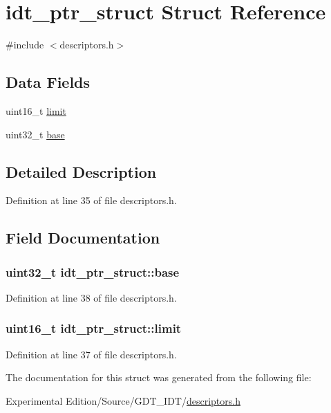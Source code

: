 \hypertarget{structidt__ptr__struct}{}\section{idt\+\_\+ptr\+\_\+struct Struct Reference}
\label{structidt__ptr__struct}


{\ttfamily \#include $<$descriptors.\+h$>$}

\subsection*{Data Fields}
\begin{DoxyCompactItemize}
\item 
uint16\+\_\+t \hyperlink{structidt__ptr__struct_a0401a63eb17ed7519442b1e828510acc}{limit}
\item 
uint32\+\_\+t \hyperlink{structidt__ptr__struct_a1d3ba4d284df0cea7c7b2d1a22a7d9fb}{base}
\end{DoxyCompactItemize}


\subsection{Detailed Description}


Definition at line 35 of file descriptors.\+h.



\subsection{Field Documentation}
\subsubsection[{\texorpdfstring{base}{base}}]{\setlength{\rightskip}{0pt plus 5cm}uint32\+\_\+t idt\+\_\+ptr\+\_\+struct\+::base}\hypertarget{structidt__ptr__struct_a1d3ba4d284df0cea7c7b2d1a22a7d9fb}{}\label{structidt__ptr__struct_a1d3ba4d284df0cea7c7b2d1a22a7d9fb}


Definition at line 38 of file descriptors.\+h.

\subsubsection[{\texorpdfstring{limit}{limit}}]{\setlength{\rightskip}{0pt plus 5cm}uint16\+\_\+t idt\+\_\+ptr\+\_\+struct\+::limit}\hypertarget{structidt__ptr__struct_a0401a63eb17ed7519442b1e828510acc}{}\label{structidt__ptr__struct_a0401a63eb17ed7519442b1e828510acc}


Definition at line 37 of file descriptors.\+h.



The documentation for this struct was generated from the following file\+:\begin{DoxyCompactItemize}
\item 
Experimental Edition/\+Source/\+G\+D\+T\+\_\+\+I\+D\+T/\hyperlink{descriptors_8h}{descriptors.\+h}\end{DoxyCompactItemize}
